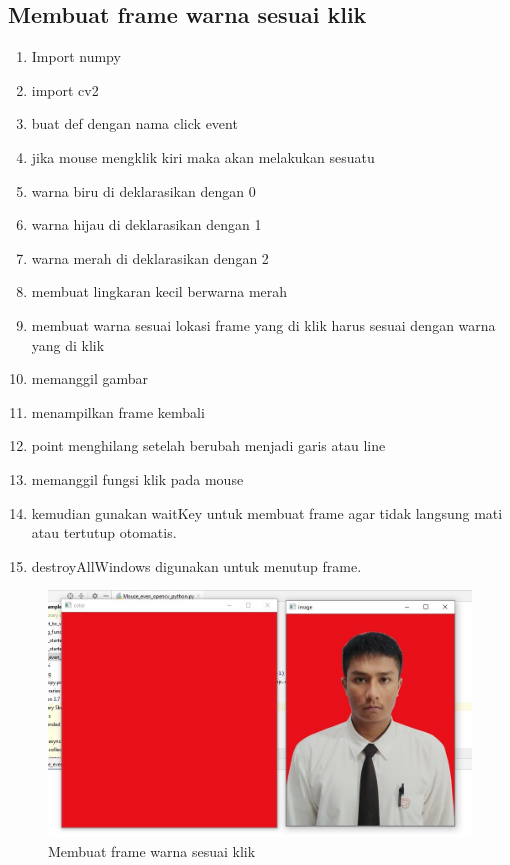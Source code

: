 \newpage
\subsection{Membuat frame warna sesuai klik}

\begin{enumerate}
	\item Import numpy
	\item import cv2
	\item buat def dengan nama click event
	\item jika mouse mengklik kiri maka akan melakukan sesuatu
	\item warna biru di deklarasikan dengan 0
	\item warna hijau di deklarasikan dengan 1
	\item warna merah di deklarasikan dengan 2
	\item membuat lingkaran kecil berwarna merah
	\item membuat warna sesuai lokasi frame yang di klik harus sesuai dengan warna yang di klik
	\item memanggil gambar
	\item menampilkan frame kembali
	\item point menghilang setelah berubah menjadi garis atau line
	\item memanggil fungsi klik pada mouse
	\item kemudian gunakan waitKey untuk membuat frame agar tidak langsung mati atau tertutup otomatis.
	\item destroyAllWindows digunakan untuk menutup frame.

\end{enumerate}

\begin{figure}[ht]
\centering
\includegraphics[scale=0.4]{figures/2,24.jpg}
\caption{Membuat frame warna sesuai klik}
\label{contoh}
\end{figure}

